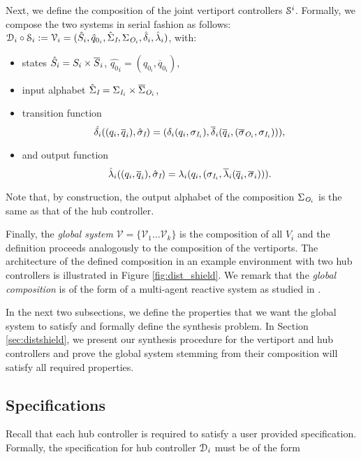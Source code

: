 Next, we define the composition of the joint vertiport controllers $\mathcal{S}^i$. %
Formally, we compose the two systems in serial fashion as follows: $\mathcal{D}_i \circ \mathcal{S}_i := \mathcal V_i =
(\hat{S}_i, \hat{q}_{0_i}, \hat{\Sigma}_{\textit{I}},\Sigma_{\textit{O}_{i}}, \hat{\delta}_i,
\hat{\lambda}_i)$, with: 
\begin{itemize}
    \item states $\hat{S}_i = S_i \times \overline{S}_i$,
    $\hat{q_{0}}_i = (q_{0_i},\overline{q}_{0_i})$,
    \item input alphabet $\hat{\Sigma}_{\textit{I}} = \Sigma_{\textit{I}_{i}} \times \overline{\Sigma}_{\textit{O}_i}$,
    \item transition function $$\hat{\delta_i}((q_i,\overline{q}_i),\hat{\sigma}_{\textit{I}}) = (\delta_i(q_i,\sigma_{\textit{I}_{i}}),\overline{\delta}_i(\overline{q}_i,(\overline{\sigma}_{\textit{O}_i},\sigma_{\textit{I}_{i}}))),$$
    \item and output function $$\hat{\lambda}_i((q_i,\overline{q}_i),\hat{\sigma}_{\textit{I}}) = \lambda_i(q_i,(\sigma_{\textit{I}_{i}},\overline{\lambda}_{i}(\overline{q}_i,\overline{\sigma}_{i}))).$$ 
\end{itemize}
   
    
    
   Note that, by construction, the output alphabet of the composition $\Sigma_{\textit{O}_{i}}$ is the same as that of the hub controller.
   

Finally, the \emph{global system} $ \mathcal V = \{ \mathcal V_1 \dots \mathcal V_k \}$ is the composition of all $V_i$ and the definition proceeds analogously to the composition of the vertiports. The architecture of the defined composition in an example environment with two hub controllers is illustrated in Figure \ref{fig:dist_shield}. We remark that the \emph{global composition} is of the form of a multi-agent reactive system as studied in \cite{multiagentshield}.

In the next two subsections, we define the properties that we want the global system to satisfy and formally define the synthesis problem.
In Section \ref{sec:distshield}, we present our synthesis procedure for the vertiport and hub controllers and prove the global system stemming from their composition will satisfy all required properties. 



\subsection{Specifications}\label{sec:specs}
Recall that each hub controller is required to satisfy a user provided specification. Formally, the specification for hub controller $\mathcal{D}_i$ must be of the form 

